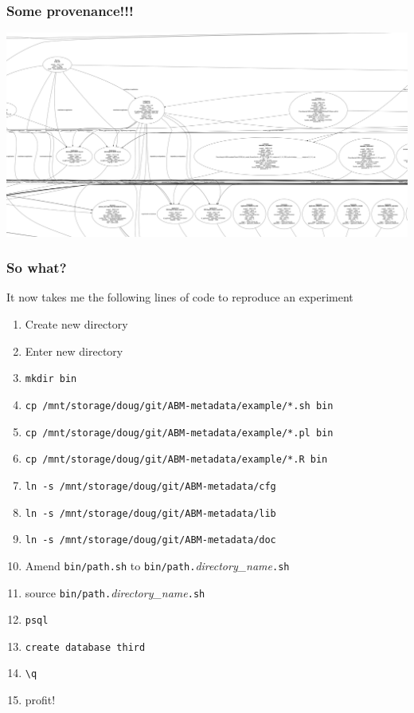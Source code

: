 \documentclass[usenames,dvipsnames,10pt]{beamer}
\begin{document}
\begin{frame}
    \frametitle{Some provenance!!!}
    \includegraphics[width=\textwidth]{img/subsection-of-provenance.png}
\end{frame}

\begin{frame}
    \frametitle{So what?}

    It now takes me the following lines of code to reproduce an experiment

    \scriptsize

    \begin{enumerate}
        \item Create new directory
        \item Enter new directory
        \item {\color{blue}\texttt{mkdir bin}}
        \item {\color{blue}\texttt{cp /mnt/storage/doug/git/ABM-metadata/example/*.sh bin}}
        \item {\color{blue}\texttt{cp /mnt/storage/doug/git/ABM-metadata/example/*.pl bin}}
        \item {\color{blue}\texttt{cp /mnt/storage/doug/git/ABM-metadata/example/*.R bin}}
        \item {\color{blue}\texttt{ln -s /mnt/storage/doug/git/ABM-metadata/cfg}}
        \item {\color{blue}\texttt{ln -s /mnt/storage/doug/git/ABM-metadata/lib}}
        \item {\color{blue}\texttt{ln -s /mnt/storage/doug/git/ABM-metadata/doc}}
        \item Amend {\color{blue}\texttt{bin/path.sh}} to {\color{blue}\texttt{bin/path.}}\textit{directory\_name}{\color{blue}\texttt{.sh}}
        \item source {\color{blue}\texttt{bin/path.}}\textit{directory\_name}{\color{blue}\texttt{.sh}}
        \item {\color{blue}\texttt{psql}}
        \item {\color{blue}\texttt{create database third}}
        \item {\color{blue}\texttt{\textbackslash{q}}}
        \item profit!
    \end{enumerate}

\end{frame}
\end{document}

